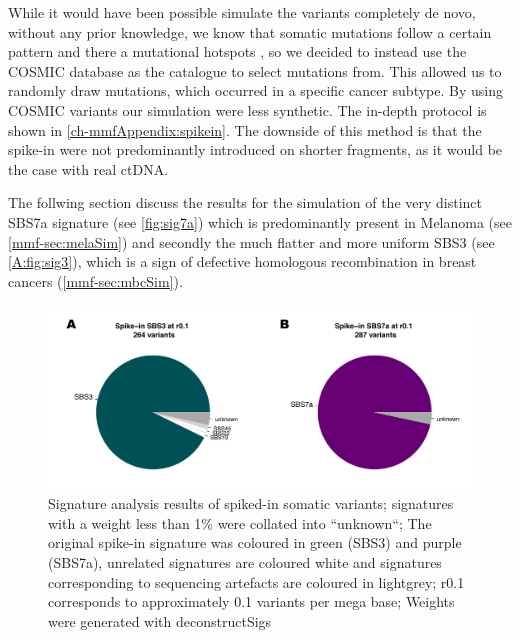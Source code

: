 While it would have been possible simulate the variants completely de novo, without any prior knowledge, we know that somatic mutations follow a certain pattern and there a mutational hotspots \cite{Chen2016,Moore2021}, so we decided to instead use the COSMIC database \cite{Tate2018,WSI2021} as the catalogue to select mutations from. This allowed us to randomly draw mutations, which occurred in a specific cancer subtype. By using COSMIC variants our simulation were less synthetic. The in-depth protocol is shown in \autoref{ch-mmfAppendix:spikein}. The downside of this method is that the spike-in were not predominantly introduced on shorter fragments, as it would be the case with real ctDNA. 

The follwing section discuss the results for the simulation of the very distinct SBS7a signature (see \autoref{fig:sig7a}) which is predominantly present in Melanoma (see \autoref{mmf-sec:melaSim}) and secondly the much flatter and more uniform SBS3 (see \autoref{A:fig:sig3}), which is a sign of defective homologous recombination in breast cancers (\autoref{mmf-sec:mbcSim}). 


\begin{figure}[ht]
\centering
\includegraphics[width=.9\linewidth]{Figures/MisMatchFinder/spikeInSanityCheck.pdf}
\caption[Signature analysis of spike-in somatic variants]{Signature analysis results of spiked-in somatic variants; signatures with a weight less than 1\% were collated into ``unknown``; The original spike-in signature was coloured in green (SBS3) and purple (SBS7a), unrelated signatures are coloured white and signatures corresponding to sequencing artefacts are coloured in lightgrey; r0.1 corresponds to approximately 0.1 variants per mega base; Weights were generated with deconstructSigs \cite{Rosenthal2016} }\label{fig:mmf-spikeinsanity}
\end{figure}


